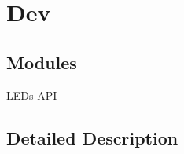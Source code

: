 \hypertarget{group__dev}{\section{Dev}
\label{group__dev}
}
\subsection*{Modules}
\begin{DoxyCompactItemize}
\item 
\hyperlink{group__leds}{L\-E\-Ds A\-P\-I}
\end{DoxyCompactItemize}


\subsection{Detailed Description}
